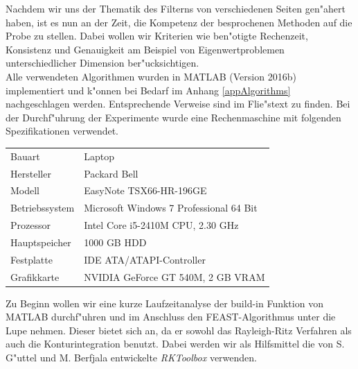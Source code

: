 Nachdem wir uns der Thematik des Filterns von verschiedenen Seiten gen"ahert haben, ist es nun an der Zeit, die Kompetenz der besprochenen Methoden auf die Probe zu stellen. Dabei wollen wir Kriterien wie ben"otigte Rechenzeit, Konsistenz und Genauigkeit am Beispiel von Eigenwertproblemen unterschiedlicher Dimension ber"ucksichtigen.\\

Alle verwendeten Algorithmen wurden in MATLAB (Version 2016b) implementiert und k"onnen bei Bedarf im Anhang \ref{appAlgorithms} nachgeschlagen werden. Entsprechende Verweise sind im Flie"stext zu finden.
Bei der Durchf"uhrung der Experimente wurde eine Rechenmaschine mit folgenden Spezifikationen verwendet.

\vspace{.5cm}
\begin{center}
	\begin{tabular}{ll}
	\hline
	Bauart & Laptop \\
	Hersteller & Packard Bell \\
	Modell & EasyNote TSX66-HR-196GE \\
	Betriebssystem & Microsoft Windows 7 Professional 64 Bit \\
	Prozessor & Intel Core i5-2410M CPU, 2.30 GHz\\
	Hauptspeicher & 1000 GB HDD\\
	Festplatte & IDE ATA/ATAPI-Controller\\
	Grafikkarte & NVIDIA GeForce GT 540M, 2 GB VRAM\\
	\hline
	\end{tabular}
\end{center}

\vspace{.5cm}
Zu Beginn wollen wir eine kurze Laufzeitanalyse der build-in Funktion  von MATLAB durchf"uhren und im Anschluss den FEAST-Algorithmus unter die Lupe nehmen. Dieser bietet sich an, da er sowohl das Rayleigh-Ritz Verfahren als auch die Konturintegration benutzt. Dabei werden wir als Hilfsmittel die von S. G"uttel und M. Berfjala entwickelte \emph{RKToolbox} \cite{rkt} verwenden.


